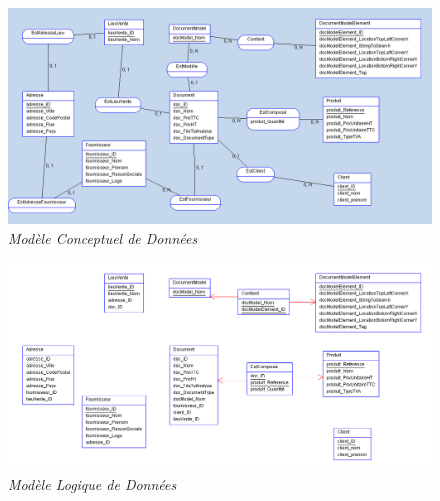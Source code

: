 \begin{figure}[h]
	\begin{center}
		\includegraphics[scale = 0.35]{img/mcd.png}
	\end{center}
	\caption{\it Modèle Conceptuel de Données}
	\label{mcd}
\end{figure}

\begin{figure}[h]
	\begin{center}
		\includegraphics[scale = 0.35]{img/mld.png}
	\end{center}
	\caption{\it Modèle Logique de Données}
	\label{mld}
\end{figure}
